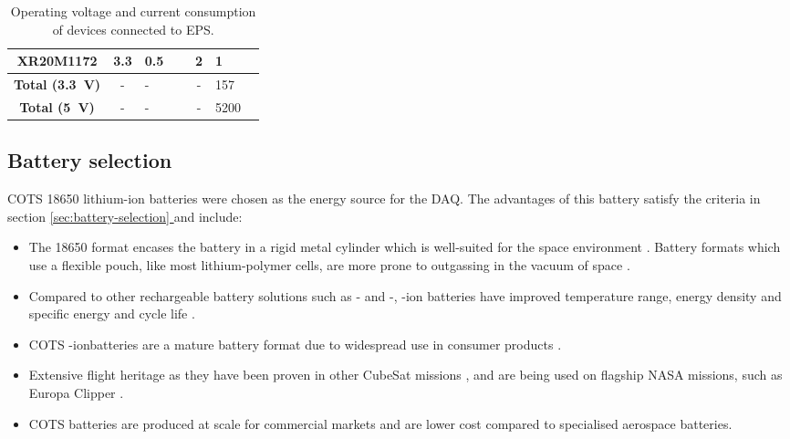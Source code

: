 \documentclass[]{report}
\newcommand*{\secref}[1]{section \hyperref[{#1}]{\ref*{#1} \nameref*{#1}}}
\newcommand{\liion}{\ce{Li}-ion}
\begin{document}
\begin{table}[H]
\begin{tabular}{|c|c|L{0.2\linewidth}|c|L{0.2\linewidth}|}
    XR20M1172                        & 3.3                           & 0.5 \cite{maxlinear2022xr20m1172}              & 2                 & 1                                         \\
    \hline
    \textbf{Total (\SI{3.3}{\volt})} & -                             & -                                              & -                 & 157                                       \\
    \textbf{Total (\SI{5}{\volt})}   & -                             & -                                              & -                 & 5200                                      \\
    \hline
  \end{tabular}
  \caption{Operating voltage and current consumption of devices connected to EPS.}
  \label{tabl:eps-power-budget-final}
\end{table}

\subsection{Battery selection}

COTS 18650 lithium-ion batteries were chosen as the energy source for the DAQ. The advantages of this battery satisfy the criteria in \secref{sec:battery-selection} and include:

\begin{itemize}
  \item The 18650 format encases the battery in a rigid metal cylinder which is well-suited for the space environment \cite{knap2020review}. Battery formats which use a flexible pouch, like most lithium-polymer cells, are more prone to outgassing in the vacuum of space \cite{knap2020review}.
  \item Compared to other rechargeable battery solutions such as - and -, -ion batteries have improved temperature range, energy density and specific energy and cycle life \cite{pathak2023review}.
  \item COTS \liion batteries are a mature battery format due to widespread use in consumer products \cite{pathak2023review}.
  \item Extensive flight heritage as they have been proven in other CubeSat missions \cite{knap2020review}, and are being used on flagship NASA missions, such as Europa Clipper \cite{krause2021performance}.
  \item COTS batteries are produced at scale for commercial markets and are lower cost compared to specialised aerospace batteries.
\end{itemize}
\end{document}

